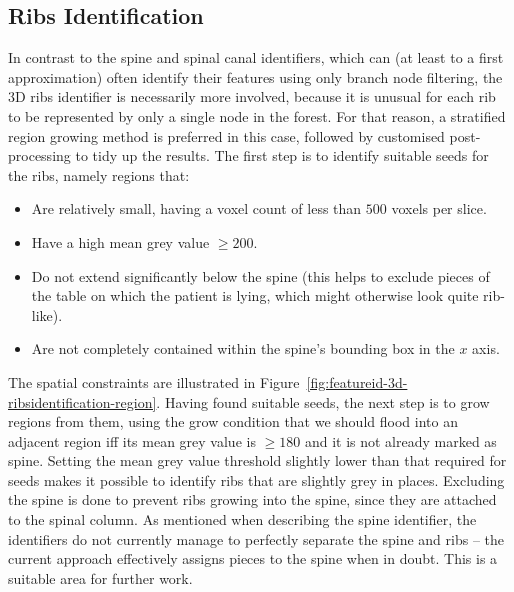
\afterpage{\clearpage}
\newpage

\subsection{Ribs Identification}
\label{subsec:featureid-3d-ribsidentification}



\noindent In contrast to the spine and spinal canal identifiers, which can (at least to a first approximation) often identify their features using only branch node filtering, the 3D ribs identifier is necessarily more involved, because it is unusual for each rib to be represented by only a single node in the forest. For that reason, a stratified region growing method is preferred in this case, followed by customised post-processing to tidy up the results. The first step is to identify suitable seeds for the ribs, namely regions that:
%
\begin{itemize}

\item Are relatively small, having a voxel count of less than $500$ voxels per slice.
\item Have a high mean grey value $\ge 200$.
\item Do not extend significantly below the spine (this helps to exclude pieces of the table on which the patient is lying, which might otherwise look quite rib-like).
\item Are not completely contained within the spine's bounding box in the $x$ axis.

\end{itemize}
%
The spatial constraints are illustrated in Figure~\ref{fig:featureid-3d-ribsidentification-region}. Having found suitable seeds, the next step is to grow regions from them, using the grow condition that we should flood into an adjacent region iff its mean grey value is $\ge 180$ and it is not already marked as spine. Setting the mean grey value threshold slightly lower than that required for seeds makes it possible to identify ribs that are slightly grey in places. Excluding the spine is done to prevent ribs growing into the spine, since they are attached to the spinal column. As mentioned when describing the spine identifier, the identifiers do not currently manage to perfectly separate the spine and ribs -- the current approach effectively assigns pieces to the spine when in doubt. This is a suitable area for further work.

